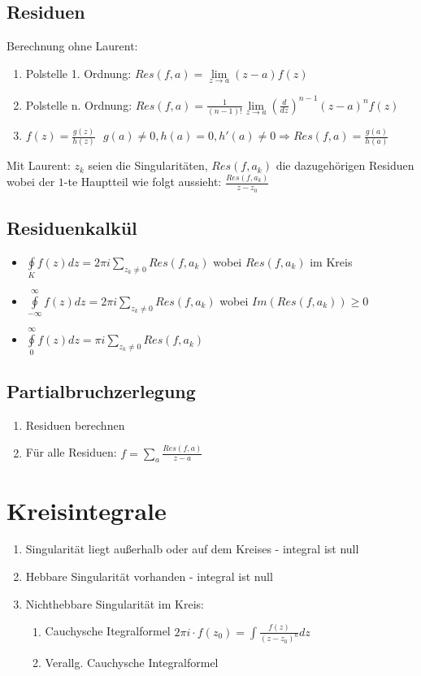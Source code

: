 \documentclass[10pt,a4paper]{article}
\begin{document}
\subsection{Residuen}
Berechnung ohne Laurent:
\begin{enumerate}
\item Polstelle 1. Ordnung: $Res(f,a) = \lim\limits_{z\rightarrow a} (z-a)f(z)$
\item Polstelle n. Ordnung: $Res(f,a) = \frac{1}{(n-1)!} \lim\limits_{z\rightarrow a} \left(\frac{d}{dz}\right)^{n-1} (z-a)^n f(z)$
\item $f(z)=\frac{g(z)}{h(z)} \,\,\,\, g(a) \neq 0, h(a) = 0, h'(a)\neq 0 \Rightarrow Res(f,a)=\frac{g(a)}{h(a)}$
\end{enumerate}

Mit Laurent:
$z_k$ seien die Singularitäten, $Res(f, a_k)$ die dazugehörigen Residuen wobei der $1$-te Hauptteil wie folgt aussieht: $\frac{Res(f, a_k)}{z-z_0}$
\subsection{Residuenkalkül}
\begin{itemize}
\item $\oint\limits_{K} f(z) dz = 2 \pi i \sum\limits_{z_k \neq 0} Res(f, a_k)$ wobei $Res(f, a_k)$ im Kreis
\item $\oint\limits_{-\infty}^{\infty} f(z) dz = 2 \pi i \sum\limits_{z_k \neq 0} Res(f, a_k)$ wobei $Im(Res(f, a_k)) \geq 0$
\item $\oint\limits_{0}^{\infty} f(z) dz = \pi i \sum\limits_{z_k \neq 0} Res(f, a_k)$
\end{itemize}

\subsection{Partialbruchzerlegung}
\begin{enumerate}
\item Residuen berechnen
\item Für alle Residuen: $f = \sum\limits_a \frac{Res(f, a)}{z-a}$
\end{enumerate}

\section{Kreisintegrale}
\begin{enumerate}
 \item Singularität liegt außerhalb oder auf dem Kreises - integral ist null
 \item Hebbare Singularität vorhanden - integral ist null
 \item Nichthebbare Singularität im Kreis:
 \begin{enumerate}
  \item Cauchysche Itegralformel $2 \pi i \cdot f(z_0) = \int \frac{f(z)}{(z-z_0)^n} dz$
  \item Verallg. Cauchysche Integralformel
 \end{enumerate}
\end{enumerate}
\end{document}
